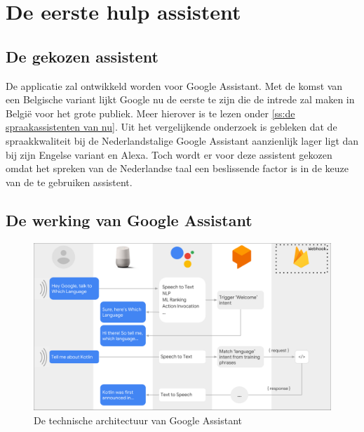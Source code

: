
\chapter{De eerste hulp assistent}
\label{ch:eerstehulpapp}

\section{De gekozen assistent}
De applicatie zal ontwikkeld worden voor Google Assistant. Met de komst van een Belgische variant lijkt Google nu de eerste te zijn die de intrede zal maken in België voor het grote publiek. Meer hierover is te lezen onder \ref{ss:de spraakassistenten van nu}.
Uit het vergelijkende onderzoek is gebleken dat de spraakkwaliteit bij de Nederlandstalige Google Assistant aanzienlijk lager ligt dan bij zijn Engelse variant en Alexa. Toch wordt er voor deze assistent gekozen omdat het spreken van de Nederlandse taal een beslissende factor is in de keuze van de te gebruiken assistent.

\section{De werking van Google Assistant}
\begin{figure}[h]
    \centering
    \includegraphics[width=0.7\linewidth]{img/gaflow}
    \caption{De technische architectuur van Google Assistant \autocite{Brandt2018}}
    \label{fig:gaflow}
\end{figure}

